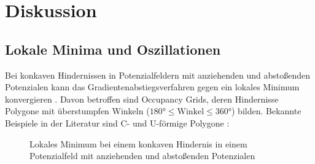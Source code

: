 \chapter{Diskussion}

\section{Lokale Minima und Oszillationen}

Bei konkaven Hindernissen in Potenzialfeldern mit anziehenden und abstoßenden Potenzialen kann das Gradientenabstiegsverfahren gegen ein lokales Minimum konvergieren \cite{yujiang.2017}.
Davon betroffen sind Occupancy Grids, deren Hindernisse Polygone mit überstumpfen Winkeln ($180\text{°} \le \text{Winkel} \le 360\text{°}$) bilden.
Bekannte Beispiele in der Literatur sind C- und U-förmige Polygone \cite{maqbool.2021, yujiang.2017}:
\begin{figure}[h!]
	\centering
	\footnotesize
	\centerline{}
	\caption{Lokales Minimum bei einem konkaven Hindernis in einem Potenzialfeld mit anziehenden und abstoßenden Potenzialen}
\end{figure}

